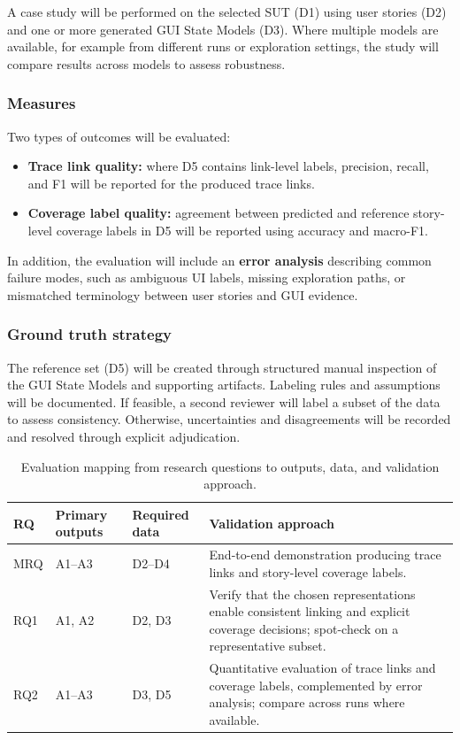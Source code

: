 A case study will be performed on the selected SUT (D1) using user stories (D2) and one or more generated GUI State Models (D3). Where multiple models are available, for example from different runs or exploration settings, the study will compare results across models to assess robustness.

\subsubsection{Measures}

Two types of outcomes will be evaluated:

\begin{itemize}
    \item \textbf{Trace link quality:}
    where D5 contains link-level labels, precision, recall, and F1 will be reported for the produced trace links.

    \item \textbf{Coverage label quality:}
    agreement between predicted and reference story-level coverage labels in D5 will be reported using accuracy and macro-F1.
\end{itemize}

In addition, the evaluation will include an \textbf{error analysis} describing common failure modes, such as ambiguous UI labels, missing exploration paths, or mismatched terminology between user stories and GUI evidence.

\subsubsection{Ground truth strategy}

The reference set (D5) will be created through structured manual inspection of the GUI State Models and supporting artifacts. Labeling rules and assumptions will be documented. If feasible, a second reviewer will label a subset of the data to assess consistency. Otherwise, uncertainties and disagreements will be recorded and resolved through explicit adjudication.

\begin{table}[h!tb]
    \centering
    \caption{Evaluation mapping from research questions to outputs, data, and validation approach.}
    \label{tab:rq-validation-mapping}
    \begin{tabular}{p{1.6cm}p{4.0cm}p{4.2cm}p{5.0cm}}
        \toprule
        \textbf{RQ} & \textbf{Primary outputs} & \textbf{Required data} & \textbf{Validation approach} \\
        \midrule
        MRQ & A1--A3 & D2--D4 & End-to-end demonstration producing trace links and story-level coverage labels. \\
        RQ1 & A1, A2 & D2, D3 & Verify that the chosen representations enable consistent linking and explicit coverage decisions; spot-check on a representative subset. \\
        RQ2 & A1--A3 & D3, D5 & Quantitative evaluation of trace links and coverage labels, complemented by error analysis; compare across runs where available. \\
        \bottomrule
    \end{tabular}
\end{table}

